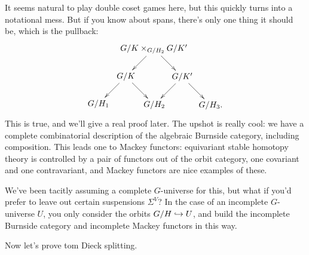 It seems natural to play double coset games here, but this quickly turns into a notational mess. But if you know
about spans, there's only one thing it should be, which is the pullback:
\[\xymatrix@dr{
	G/K\times_{G/H_2} G/K'\ar[r]\ar[d] & G/K'\ar[r]\ar[d] & G/H_3.\\
	G/K\ar[r]\ar[d] & G/H_2\\
	G/H_1
}\]
This is true, and we'll give a real proof later. The upshot is really cool: we have a complete combinatorial
description of the algebraic Burnside category, including composition. This leads one to Mackey functors:
equivariant stable homotopy theory is controlled by a pair of functors out of the orbit category, one covariant and
one contravariant, and Mackey functors are nice examples of these.
\begin{rem}
We've been tacitly assuming a complete $G$-universe for this, but what if you'd prefer to leave out certain
suspensions $\Sigma^V$? In the case of an incomplete $G$-universe $U$, you only consider the orbits $G/H\hookrightarrow U$,
and build the incomplete Burnside category and incomplete Mackey functors in this way.
\end{rem}
Now let's prove tom Dieck splitting.
